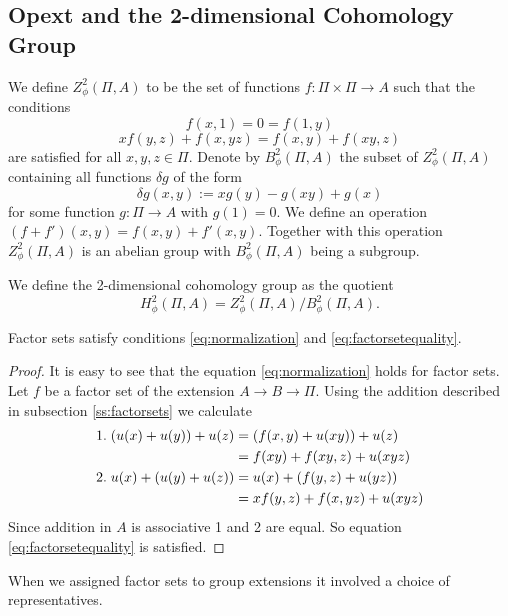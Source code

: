 \subsection{Opext and the 2-dimensional Cohomology Group}
\label{ss:opext}
We define $Z^2_\phi (\Pi,A)$ to be the set of functions $f:\Pi \times \Pi \to A$ such that the conditions
\begin{equation}
\label{eq:normalization}
f(x,1) = 0 = f(1,y)
\end{equation}
\begin{equation}
\label{eq:factorsetequality}
xf(y,z)+f(x,yz) = f(x,y) + f(xy,z)
\end{equation}
are satisfied for all $x,y,z\in \Pi$.
Denote by $B^2_\phi (\Pi,A)$ the subset of $Z^2_\phi (\Pi,A)$ containing all functions $\delta g$ of the form 
\begin{equation}
\label{eq:deltag}
\delta g (x,y) := xg(y)-g(xy)+g(x)
\end{equation}
for some function $g:\Pi \to A$ with $g(1)=0$.
We define an operation $(f + f') (x,y)= f(x,y) + f'(x,y)$.
Together with this operation $Z^2_\phi (\Pi,A)$ is an abelian group with $B^2_\phi (\Pi,A)$ being a subgroup. %
\begin{definition}
We define the 2-dimensional cohomology group as the quotient 
\[
H^2_\phi (\Pi,A) = Z^2_\phi (\Pi,A) / B^2_\phi (\Pi,A).
\]
\end{definition}
\begin{lemma}
Factor sets satisfy conditions \eqref{eq:normalization} and \eqref{eq:factorsetequality}.
\end{lemma}
\begin{proof}
It is easy to see that the equation \eqref{eq:normalization} holds for factor sets.
Let $f$ be a factor set of the extension $A\to B \to \Pi$.
Using the addition described in subsection \ref{ss:factorsets} we calculate
\begin{align*}
\text{1.\;}(u(x)+  u(y)) + u(z)  &= (f(x,y)+u(xy))+u(z) \\&= f(xy) + f(xy,z) + u(xyz) \\
\text{2.\;} u(x)+ (u(y)  + u(z)) &= u(x)+(f(y,z) + u(yz)) \\&= xf(y,z) + f(x,yz) + u(xyz)
\end{align*}
Since addition in $A$ is associative 1 and 2 are equal.
So equation \eqref{eq:factorsetequality} is satisfied.
\end{proof}
When we assigned factor sets to group extensions it involved a choice of representatives.
